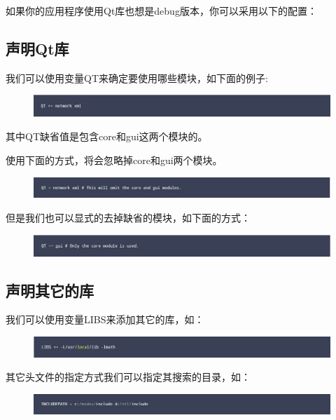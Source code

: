 如果你的应用程序使用Qt库也想是debug版本，你可以采用以下的配置：


\subsection{声明Qt库}
我们可以使用变量{\color{seagreen}QT}来确定要使用哪些模块，如下面的例子:
\begin{figure}[htbp]
  \centering
  \includegraphics[width=\textwidth]{qmake/images/zhuijia}
\end{figure}

其中QT缺省值是包含core和gui这两个模块的。

使用下面的方式，将会忽略掉core和gui两个模块。
\begin{figure}[htbp]
  \centering
  \includegraphics[width=\textwidth]{qmake/images/fuzhi}
\end{figure}

但是我们也可以显式的去掉缺省的模块，如下面的方式：
\begin{figure}[htbp]
  \centering
  \includegraphics[width=\textwidth]{qmake/images/jianqu}
\end{figure}

\subsection{声明其它的库}
我们可以使用变量{\color{seagreen}LIBS}来添加其它的库，如：
\begin{figure}[htbp]
  \centering
  \includegraphics[width=\textwidth]{qmake/images/libs}
\end{figure}

其它头文件的指定方式我们可以指定其搜索的目录，如：
\begin{figure}[htbp]
  \centering
  \includegraphics[width=\textwidth]{qmake/images/headers_path}
\end{figure}





